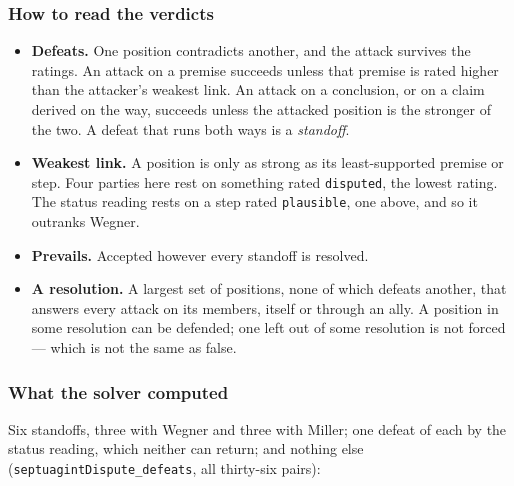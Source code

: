 \documentclass[11pt]{article}
\begin{document}
\subsubsection*{How to read the verdicts}
\begin{itemize}
  \item \textbf{Defeats.} One position contradicts another, and the attack survives the ratings. An attack on a premise succeeds unless that premise is rated higher than the attacker’s weakest link. An attack on a conclusion, or on a claim derived on the way, succeeds unless the attacked position is the stronger of the two. A defeat that runs both ways is a \emph{standoff}.
  \item \textbf{Weakest link.} A position is only as strong as its least-supported premise or step. Four parties here rest on something rated \texttt{disputed}, the lowest rating. The status reading rests on a step rated \texttt{plausible}, one above, and so it outranks Wegner.
  \item \textbf{Prevails.} Accepted however every standoff is resolved.
  \item \textbf{A resolution.} A largest set of positions, none of which defeats another, that answers every attack on its members, itself or through an ally. A position in some resolution can be defended; one left out of some resolution is not forced — which is not the same as false.
\end{itemize}
\subsubsection*{What the solver computed}
Six standoffs, three with Wegner and three with Miller; one defeat of each by the status reading, which neither can return; and nothing else (\texttt{septuagint\allowbreak{}Dispute\_\allowbreak{}defeats}, all thirty-six pairs):
\end{document}
